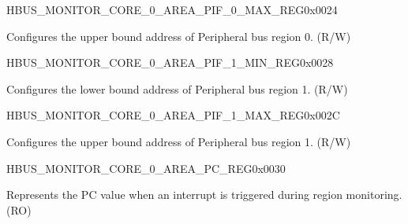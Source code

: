 \begin{register}{H}{BUS\_MONITOR\_CORE\_0\_AREA\_PIF\_0\_MAX\_REG}{0x0024}\label{regdesc:BUSMONITORCORE0AREAPIF0MAXREG}
%
\regnewline%
\begin{regdesc}\begin{reglist}
\label{fielddesc:BUSMONITORCORE0AREAPIF0MAX}\item [BUS\_MONITOR\_CORE\_0\_AREA\_PIF\_0\_MAX] Configures the upper bound address of Peripheral bus region 0. (R/W)
\end{reglist}\end{regdesc}
\end{register}


\begin{register}{H}{BUS\_MONITOR\_CORE\_0\_AREA\_PIF\_1\_MIN\_REG}{0x0028}\label{regdesc:BUSMONITORCORE0AREAPIF1MINREG}
%
\regnewline%
\begin{regdesc}\begin{reglist}
\label{fielddesc:BUSMONITORCORE0AREAPIF1MIN}\item [BUS\_MONITOR\_CORE\_0\_AREA\_PIF\_1\_MIN] Configures the lower bound address of Peripheral bus region 1. (R/W)
\end{reglist}\end{regdesc}
\end{register}


\begin{register}{H}{BUS\_MONITOR\_CORE\_0\_AREA\_PIF\_1\_MAX\_REG}{0x002C}\label{regdesc:BUSMONITORCORE0AREAPIF1MAXREG}
%
\regnewline%
\begin{regdesc}\begin{reglist}
\label{fielddesc:BUSMONITORCORE0AREAPIF1MAX}\item [BUS\_MONITOR\_CORE\_0\_AREA\_PIF\_1\_MAX] Configures the upper bound address of Peripheral bus region 1. (R/W)
\end{reglist}\end{regdesc}
\end{register}


\begin{register}{H}{BUS\_MONITOR\_CORE\_0\_AREA\_PC\_REG}{0x0030}\label{regdesc:BUSMONITORCORE0AREAPCREG}
%
\regnewline%
\begin{regdesc}\begin{reglist}
\label{fielddesc:BUSMONITORCORE0AREAPC}\item [BUS\_MONITOR\_CORE\_0\_AREA\_PC] Represents the PC value when an interrupt is triggered during region monitoring. (RO)
\end{reglist}\end{regdesc}
\end{register}


